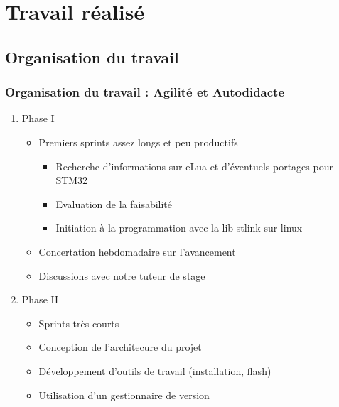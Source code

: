 \documentclass{beamer}
\begin{document}
\section{Travail réalisé}
\subsection{Organisation du travail}
\begin{frame}
\frametitle{Organisation du travail : Agilité et Autodidacte}
\begin{enumerate}
 \item Phase I
\begin{itemize}
\item Premiers sprints assez longs et peu productifs
\begin{itemize}
\item Recherche d'informations sur eLua et d'éventuels portages pour STM32
\item Evaluation de la faisabilité
\item Initiation à la programmation avec la lib stlink sur linux
\end{itemize}
\item Concertation hebdomadaire sur l'avancement
\item Discussions avec notre tuteur de stage
\end{itemize}
 \item Phase II
\begin{itemize}
\item Sprints très courts
\item Conception de l'architecure du projet
\item Développement d'outils de travail (installation, flash)
\item Utilisation d'un gestionnaire de version
\end{itemize}
\end{enumerate}
\end{frame}
\end{document}
